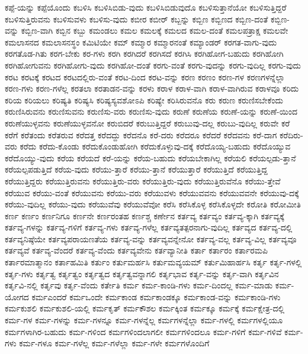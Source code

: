 {ಕಪ್ಪೆ-ಯನ್ನು
ಕಪ್ಪೆಯೊಂದು
ಕಬಳಿಸಿ
ಕಬಳಿಸಿಬಿಡು-ವುದು
ಕಬಳಿಸಿಬಿಡುವುದೊ
ಕಬಳಿಸುತ್ತಾನೆಯೋ
ಕಬಳಿಸುತ್ತಿದ್ದರೆ
ಕಬಳಿಸುತ್ತಿರುವನು
ಕಬಳಿಸುವಳು
ಕಬಳಿಸು-ವುದು
ಕಬೀರ
ಕಬೀರ್
ಕಬ್ಬನ್ನು
ಕಬ್ಬಿಣ
ಕಬ್ಬಿಣದ
ಕಬ್ಬಿಣ-ದಂತೆ
ಕಬ್ಬಿಣ-ವನ್ನು
ಕಬ್ಬಿಣ-ವಾಗಿ
ಕಬ್ಬಿನ
ಕಬ್ಬು
ಕಮಂಡಲು
ಕಮಲ
ಕಮಲಕ್ಕೆ
ಕಮಲದ
ಕಮಲ-ದಂತೆ
ಕಮಲಪತ್ರಾಕ್ಷ
ಕಮಲವೇ
ಕಮಲಾಸನದ
ಕಮಲಾಸನಸ್ಥಂ
ಕಮಿಟಿಯೇ
ಕಮ್
ಕಮ್ಮಾರ
ಕಮ್ಮಾರನಂತೆ
ಕಮ್ಯಾಂಡರ್
ಕರಗತ-ವಾಗು-ವುದು
ಕರಗತೊಡ-ಗಿತು
ಕರಗ-ಬೇಕು
ಕರ-ಗಳು
ಕರಗಿ
ಕರಗಿದರೆ
ಕರಗಿಸದೆ
ಕರಗಿಸಿ
ಕರಗಿಹೋಗ-ಬಹುದು
ಕರಗಿಹೋಗಿ
ಕರಗಿಹೋಗುವನು
ಕರಗಿಹೋಗು-ವುದು
ಕರಗಿಹೋ-ದಂತೆ
ಕರಗು-ವಂತೆ
ಕರಗು-ವುದನ್ನು
ಕರಗು-ವುದಿಲ್ಲ
ಕರಗು-ವುದು
ಕರಟ
ಕರಟಕ್ಕೆ
ಕರಟದ
ಕರಟದಲ್ಲಿರು-ವಂತೆ
ಕರಟ-ದಿಂದ
ಕರಟ-ವನ್ನು
ಕರಣ
ಕರಣಂ
ಕರಣ-ಗಳ
ಕರಣಗಳನ್ನೆಲ್ಲಾ
ಕರಣ-ಗಳು
ಕರಣ-ಗಳೆಲ್ಲ
ಕರತಲಾ
ಕರತಾಡನ-ವನ್ನು
ಕರಳು
ಕರಾಳ
ಕರಾಳ-ವಾಗಿ
ಕರಾಳ-ವಾಗಿರುವ
ಕರಾಳವೂ
ಕರಿದು
ಕರಿಯ
ಕರಿಯಲು
ಕರಿಷ್ಯತಿ
ಕರಿಷ್ಯಸಿ
ಕರಿಷ್ಯಸ್ಯವಶೋಽಪಿ
ಕರಿಷ್ಯೇ
ಕರಿಸಿರುವನೊ
ಕರು
ಕರುಣ
ಕರುಣಿಸಬೇಕೆಂದು
ಕರುಣಿಸಿರುವನು
ಕರುಣಿಸುವನು
ಕರುಣಿಸು-ವರು
ಕರುಣಿಸು-ವುದು
ಕರುಣೆ
ಕರುಣೆಯ
ಕರುಣೆ-ಯನ್ನು
ಕರುಣೆ-ಯಿಂದ
ಕರುಣೆಯುಳ್ಳವನು
ಕರುಣೆಯುಳ್ಳವನೋ
ಕರುಬಿದರೆ
ಕರುಬುತ್ತಿದ್ದರೆ
ಕರುಬುವು-ದಲ್ಲ
ಕರುಬು-ವುದಿಲ್ಲ
ಕರುವೇ
ಕರೆ
ಕರೆಗೆ
ಕರೆತಂದು
ಕರೆತರುವ
ಕರೆದತ್ತ
ಕರೆದದ್ದು
ಕರೆದನೊ
ಕರೆ-ದರು
ಕರೆದರೂ
ಕರೆದರೆ
ಕರೆದವನು
ಕರೆ-ದಾಗ
ಕರೆದಿರು-ವರು
ಕರೆದು
ಕರೆದು-ಕೊಂಡು
ಕರೆದುಕೊಂಡುಹೋಗಿ
ಕರೆದುಕೊಳ್ಳುವು-ದಕ್ಕೆ
ಕರೆದೊಯ್ಯ-ಬಹುದು
ಕರೆದೊಯ್ಯುವ
ಕರೆದೊಯ್ಯು-ವುದು
ಕರೆಯ
ಕರೆಯದೆ
ಕರೆ-ಯನ್ನು
ಕರೆಯ-ಬಹುದು
ಕರೆಯಬೇಕಾಗಿಲ್ಲ
ಕರೆಯಲಿ
ಕರೆಯಲ್ಪಡು-ತ್ತಾನೆ
ಕರೆಯಲ್ಪಪಡುತ್ತಿದೆ
ಕರೆಯ-ವುದು
ಕರೆಯು-ತ್ತಾರೆ
ಕರೆಯು-ತ್ತಾನೆ
ಕರೆಯುತ್ತಾರೆ
ಕರೆಯುತ್ತಿದೆ
ಕರೆಯುತ್ತಿದ್ದ
ಕರೆಯುತ್ತಿದ್ದರು
ಕರೆಯುತ್ತಿರುವನು
ಕರೆಯುತ್ತಿರು-ವರು
ಕರೆಯುತ್ತಿರು-ವುದು
ಕರೆಯುತ್ತಿರುವೆನೊ
ಕರೆಯು-ತ್ತೇವೆ
ಕರೆಯುವ
ಕರೆಯು-ವಂತೆ
ಕರೆಯುವನು
ಕರೆಯು-ವರು
ಕರೆಯುವಳು
ಕರೆಯುವವನು
ಕರೆಯುವವನೇ
ಕರೆಯುವು-ದಕ್ಕೆ
ಕರೆಯು-ವುದಿಲ್ಲ
ಕರೆಯು-ವುದು
ಕರೆಯುವೆವು
ಕರೆಯುವೆವೋ
ಕರೆಸಿ
ಕರೆಸಿಕೊಳ್ಳ
ಕರೆಸಿಕೊಳ್ಳದೇ
ಕರೋತಿ
ಕರೋಮೀತಿ
ಕರ್ಣ
ಕರ್ಣಂ
ಕರ್ಣನಿಗೂ
ಕರ್ಣನೇ
ಕರ್ಣರಂತಹ
ಕರ್ಣಶ್ಚ
ಕರ್ಣೇನ
ಕರ್ತವ್ಯ
ಕರ್ತವ್ಯಂ
ಕರ್ತವ್ಯ-ಕ್ಕಾಗಿ
ಕರ್ತವ್ಯಕ್ಕೆ
ಕರ್ತವ್ಯ-ಗಳನ್ನು
ಕರ್ತವ್ಯ-ಗಳಿಗೆ
ಕರ್ತವ್ಯ-ಗಳು
ಕರ್ತವ್ಯ-ಗಳೆಲ್ಲ
ಕರ್ತವ್ಯತತ್ಪರನಾಗು-ವುದಿಲ್ಲ
ಕರ್ತವ್ಯದ
ಕರ್ತವ್ಯ-ದಲ್ಲಿ
ಕರ್ತವ್ಯನಿಷ್ಠೆಯೇ
ಕರ್ತವ್ಯಪರಾಯಣತೆಯ
ಕರ್ತವ್ಯ-ವನ್ನು
ಕರ್ತವ್ಯವನ್ನೇನೋ
ಕರ್ತವ್ಯ-ವಲ್ಲ
ಕರ್ತವ್ಯ-ವಿಲ್ಲ
ಕರ್ತವ್ಯವೂ
ಕರ್ತವ್ಯವೆ
ಕರ್ತವ್ಯ-ವೆಂದರೆ
ಕರ್ತವ್ಯ-ವೆಂದು
ಕರ್ತವ್ಯವೇನು
ಕರ್ತವ್ಯಾನೀತಿ
ಕರ್ತಾ
ಕರ್ತಾರಂ
ಕರ್ತಾರಮಪಿ
ಕರ್ತಾರಮಾತ್ಮಾನಂ
ಕರ್ತಾಹಮಿತಿ
ಕರ್ತುಂ
ಕರ್ತುಮರ್ಹಸಿ
ಕರ್ತುಮವ್ಯಯಮ್
ಕರ್ತುಮಿಹಾರ್ಹಸಿ
ಕರ್ತೃ
ಕರ್ತೃ-ಗಳಲ್ಲಿ
ಕರ್ತೃ-ಗಳು
ಕರ್ತೃತ್ವ
ಕರ್ತೃತ್ವಂ
ಕರ್ತೃತ್ವದ
ಕರ್ತೃತ್ವವನ್ನಾಗಲಿ
ಕರ್ತೃಭಾವ
ಕರ್ತೃ-ವನ್ನು
ಕರ್ತೃ-ವಾಗಿ
ಕರ್ತೃವಿನ
ಕರ್ತೃವಿ-ನಲ್ಲಿ
ಕರ್ತೃವು
ಕರ್ತೃ-ವೆಂದು
ಕರ್ತೇತಿ
ಕರ್ಮ
ಕರ್ಮ-ಕಾಂಡಿ-ಗಳು
ಕರ್ಮ-ದಿಂದಲ್ಲ
ಕರ್ಮ-ಮಾಡು
ಕರ್ಮ-ಯೋಗದ
ಕರ್ಮಎಂದರೆ
ಕರ್ಮಒಂದೇ
ಕರ್ಮಕಾಂಡ
ಕರ್ಮಕಾಂಡಕ್ಕೂ
ಕರ್ಮಕಾಂಡ-ವನ್ನು
ಕರ್ಮಕಾಂಡಿ-ಗಳು
ಕರ್ಮಕುಶಲಿ
ಕರ್ಮಕುಶಲಿ-ಯಲ್ಲಿ
ಕರ್ಮಕೃತ್
ಕರ್ಮಕೌಶಲ
ಕರ್ಮಕ್ಕಿಂತ
ಕರ್ಮಕ್ಕೂ
ಕರ್ಮಕ್ಕೆ
ಕರ್ಮಕ್ಷೇತ್ರ-ದಲ್ಲಿ
ಕರ್ಮ-ಗಳ
ಕರ್ಮ-ಗಳನ್ನು
ಕರ್ಮ-ಗಳನ್ನೂ
ಕರ್ಮ-ಗಳನ್ನೆಲ್ಲ
ಕರ್ಮಗಳನ್ನೆಲ್ಲಾ
ಕರ್ಮ-ಗಳಲ್ಲಿ
ಕರ್ಮಗಳಲ್ಲಿಯೂ
ಕರ್ಮಗಳಾಗಿರ-ಬಹುದು
ಕರ್ಮ-ಗಳಿಂದ
ಕರ್ಮಗಳಿಂದಲಾಗಲೀ
ಕರ್ಮಗಳಿಂದಲೂ
ಕರ್ಮ-ಗಳಿಗೆ
ಕರ್ಮ-ಗಳಿವೆ
ಕರ್ಮ-ಗಳು
ಕರ್ಮ-ಗಳೂ
ಕರ್ಮ-ಗಳೆಲ್ಲ
ಕರ್ಮ-ಗಳೆಲ್ಲಾ
ಕರ್ಮ-ಗಳೇ
ಕರ್ಮಗಳೊಂದಿಗೆ
}
